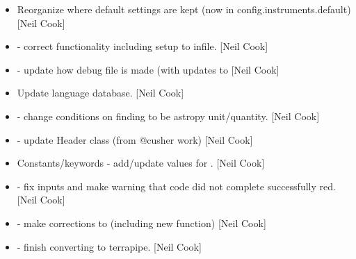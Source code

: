 \documentclass[a4paper,10pt,english]{report}
\begin{document}
\begin{itemize}
\item {} 
Reorganize where default settings are kept (now in
config.instruments.default) {[}Neil Cook{]}

\item {} 
 - correct  functionality including
setup to infile. {[}Neil Cook{]}

\item {} 
 - update how debug file is made (with updates to
 {[}Neil Cook{]}

\item {} 
Update language database. {[}Neil Cook{]}

\item {} 
 - change conditions on finding  to be astropy
unit/quantity. {[}Neil Cook{]}

\item {} 
 - update Header class (from @cusher work) {[}Neil Cook{]}

\item {} 
Constants/keywords - add/update values for . {[}Neil Cook{]}

\item {} 
 - fix  inputs and make warning that code
did not complete successfully red. {[}Neil Cook{]}

\item {} 
 - make corrections to  (including new
 function) {[}Neil Cook{]}

\item {} 
 - finish converting  to
terrapipe. {[}Neil Cook{]}

\end{itemize}
\end{document}
